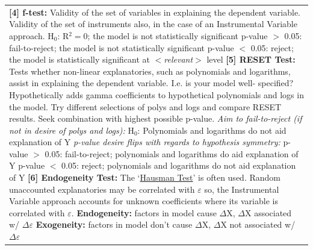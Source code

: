 \documentclass[11pt, english]{article}
\begin{document}
\begin{center}
\begin{longtable}{p{14cm}}
			\textbf{[4] f-test: }Validity of the set of variables in explaining the dependent variable. Validity of the set of instruments also, in the case of an Instrumental Variable approach.\newline\newline
			H$_0$: R$^2=0$; the model is not statistically significant\newline\newline
			p-value $>$ 0.05: fail-to-reject; the model is not statistically significant\newline
			p-value $<$ 0.05: reject; the model is statistically significant at $<$\textit{relevant}$>$ level\newline\newline
			\textbf{[5] RESET Test: }Tests whether non-linear explanatories, such as polynomials and logarithms, assist in explaining the dependent variable. I.e. is your model well- specified? Hypothetically adds gamma coefficients to hypothetical polynomials and logs in the model. Try different selections of polys and logs and compare RESET results. Seek combination with highest possible p-value.\newline\newline
			\textit{Aim to fail-to-reject (if not in desire of polys and logs):}\newline
			H$_0$: Polynomials and logarithms do not aid explanation of Y\newline\newline
			\textit{p-value desire flips with regards to hypothesis symmetry:}\newline
			p-value $>$ 0.05: fail-to-reject; polynomials and logarithms do aid explanation of Y\newline
			p-value $<$ 0.05: reject; polynomials and logarithms do not aid explanation of Y\newline\newline
			\textbf{[6] Endogeneity Test: }The `\underline{Hausman Test}' is often used. Random unaccounted explanatories may be correlated with $\varepsilon$ so, the Instrumental Variable approach accounts for unknown coefficients where its variable is correlated with $\varepsilon$.\newline\newline
			\textbf{Endogeneity: }factors in model cause $\Delta$X, $\Delta$X associated w/ $\Delta\varepsilon$\newline
			\textbf{Exogeneity: }factors in model don't cause $\Delta$X, $\Delta$X not associated w/ $\Delta\varepsilon$\newline\newline 

\end{longtable}
\end{center}
\end{document}
